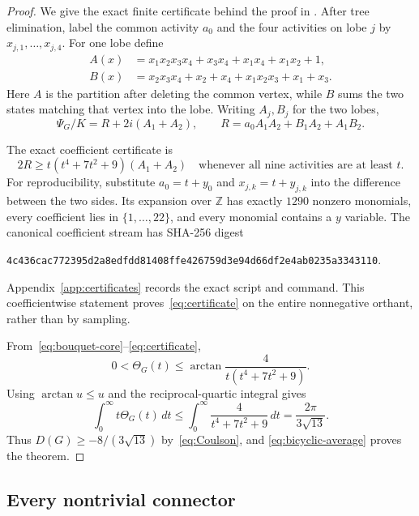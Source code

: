 \documentclass[11pt]{article}
\theoremstyle{remark}
\begin{document}
\begin{proof}
We give the exact finite certificate behind the proof in
\cite{BouquetCompanion}.  After tree elimination, label the common activity
$a_0$ and the four activities on lobe $j$ by $x_{j,1},\ldots,x_{j,4}$.
For one lobe define
\begin{align*}
 A(x)&=x_1x_2x_3x_4+x_3x_4+x_1x_4+x_1x_2+1,\\
 B(x)&=x_2x_3x_4+x_2+x_4+x_1x_2x_3+x_1+x_3.
\end{align*}
Here $A$ is the partition after deleting the common vertex, while $B$ sums
the two states matching that vertex into the lobe.  Writing $A_j,B_j$ for the
two lobes,
\begin{equation}\label{eq:bouquet-core}
 \Psi_G/K=R+2i(A_1+A_2),\qquad
 R=a_0A_1A_2+B_1A_2+A_1B_2.
\end{equation}

The exact coefficient certificate is
\begin{equation}\label{eq:certificate}
 2R\geq t(t^4+7t^2+9)(A_1+A_2)
 \quad\text{whenever all nine activities are at least }t.
\end{equation}
For reproducibility, substitute $a_0=t+y_0$ and
$x_{j,k}=t+y_{j,k}$ into the difference between the two sides.  Its expansion
over $\mathbb Z$ has exactly $1290$ nonzero monomials, every coefficient lies
in $\{1,\ldots,22\}$, and every monomial contains a $y$ variable.  The
canonical coefficient stream has SHA-256 digest
\begin{center}
\texttt{4c436cac772395d2a8edfdd81408ffe426759d3e94d66df2e4ab0235a3343110}.
\end{center}
Appendix~\ref{app:certificates} records the exact script and command.  This
coefficientwise statement proves~\eqref{eq:certificate} on the entire
nonnegative orthant, rather than by sampling.

From~\eqref{eq:bouquet-core}--\eqref{eq:certificate},
\[
 0<\Theta_G(t)\leq\arctan\frac4{t(t^4+7t^2+9)}.
\]
Using $\arctan u\leq u$ and the reciprocal-quartic integral gives
\[
 \int_0^\infty t\Theta_G(t)\,dt
 \leq\int_0^\infty\frac4{t^4+7t^2+9}\,dt
 =\frac{2\pi}{3\sqrt{13}}.
\]
Thus $D(G)\geq-8/(3\sqrt{13})$ by~\eqref{eq:Coulson}, and
\eqref{eq:bicyclic-average} proves the theorem.
\end{proof}

\subsection{Every nontrivial connector}
\end{document}
